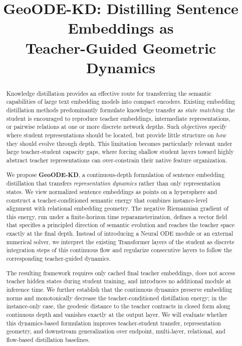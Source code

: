 \documentclass[11pt]{article}
\title{GeoODE-KD\@: Distilling Sentence Embeddings as\\
Teacher-Guided Geometric Dynamics}
\author{}
\date{}
\begin{document}
\maketitle



\begin{abstract}
Knowledge distillation provides an effective route for transferring the
semantic capabilities of large text embedding models into compact encoders.
Existing embedding distillation methods predominantly formulate knowledge
transfer as \emph{state matching}: the student is encouraged to reproduce
teacher embeddings, intermediate representations, or pairwise relations at
one or more discrete network depths. Such objectives specify where student
representations should be located, but provide little structure on
\emph{how} they should evolve through depth. This limitation becomes
particularly relevant under large teacher-student capacity gaps, where
forcing shallow student layers toward highly abstract teacher
representations can over-constrain their native feature organization.

We propose \textbf{GeoODE-KD}, a continuous-depth formulation of sentence
embedding distillation that transfers \emph{representation dynamics} rather
than only representation states. We view normalized sentence embeddings as
points on a hypersphere and construct a teacher-conditioned semantic energy
that combines instance-level alignment with relational embedding geometry.
The negative Riemannian gradient of this energy, run under a finite-horizon
time reparameterization, defines a vector field that specifies a principled
direction of semantic evolution and reaches the teacher space exactly at the
final depth.
Instead of introducing a Neural ODE module or an external numerical solver,
we interpret the existing Transformer layers of the student as discrete
integration steps of this continuous flow and regularize consecutive layers
to follow the corresponding teacher-guided dynamics.

The resulting framework requires only cached final teacher embeddings,
does not access teacher hidden states during student training, and introduces
no additional module at inference time. We further establish that the
continuous dynamics preserve embedding norms and monotonically decrease the
teacher-conditioned distillation energy; in the instance-only case, the
geodesic distance to the teacher contracts in closed form along continuous
depth and vanishes exactly at the output layer.
We will evaluate whether this dynamics-based formulation improves
teacher-student transfer, representation geometry, and downstream
generalization over endpoint, multi-layer, relational, and flow-based
distillation baselines.
\end{abstract}
\end{document}
